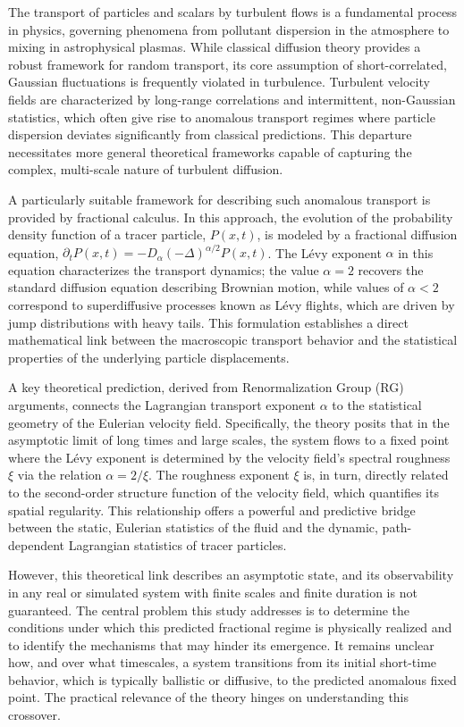 \documentclass[]{article}
\begin{document}
The transport of particles and scalars by turbulent flows is a fundamental process in physics, governing phenomena from pollutant dispersion in the atmosphere to mixing in astrophysical plasmas. While classical diffusion theory provides a robust framework for random transport, its core assumption of short-correlated, Gaussian fluctuations is frequently violated in turbulence. Turbulent velocity fields are characterized by long-range correlations and intermittent, non-Gaussian statistics, which often give rise to anomalous transport regimes where particle dispersion deviates significantly from classical predictions. This departure necessitates more general theoretical frameworks capable of capturing the complex, multi-scale nature of turbulent diffusion.

A particularly suitable framework for describing such anomalous transport is provided by fractional calculus. In this approach, the evolution of the probability density function of a tracer particle, $P(x,t)$, is modeled by a fractional diffusion equation, $\partial_t P(x,t) = -D_\alpha(-\Delta)^{\alpha/2} P(x,t)$. The Lévy exponent $\alpha$ in this equation characterizes the transport dynamics; the value $\alpha=2$ recovers the standard diffusion equation describing Brownian motion, while values of $\alpha < 2$ correspond to superdiffusive processes known as Lévy flights, which are driven by jump distributions with heavy tails. This formulation establishes a direct mathematical link between the macroscopic transport behavior and the statistical properties of the underlying particle displacements.

A key theoretical prediction, derived from Renormalization Group (RG) arguments, connects the Lagrangian transport exponent $\alpha$ to the statistical geometry of the Eulerian velocity field. Specifically, the theory posits that in the asymptotic limit of long times and large scales, the system flows to a fixed point where the Lévy exponent is determined by the velocity field's spectral roughness $\xi$ via the relation $\alpha = 2/\xi$. The roughness exponent $\xi$ is, in turn, directly related to the second-order structure function of the velocity field, which quantifies its spatial regularity. This relationship offers a powerful and predictive bridge between the static, Eulerian statistics of the fluid and the dynamic, path-dependent Lagrangian statistics of tracer particles.

However, this theoretical link describes an asymptotic state, and its observability in any real or simulated system with finite scales and finite duration is not guaranteed. The central problem this study addresses is to determine the conditions under which this predicted fractional regime is physically realized and to identify the mechanisms that may hinder its emergence. It remains unclear how, and over what timescales, a system transitions from its initial short-time behavior, which is typically ballistic or diffusive, to the predicted anomalous fixed point. The practical relevance of the theory hinges on understanding this crossover.
\end{document}
